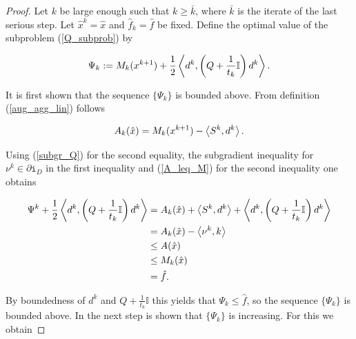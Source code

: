 \begin{proof}
	Let \(k\) be large enough such that \(k \geq \bar{k}\), where \(\bar{k}\) is the iterate of the last serious step. Let \(\hat{x}^k = \hat{x}\) and \(\hat{f}_k=\hat{f}\) be fixed.
	Define the optimal value of the subproblem (\ref{Q_subprob}) by 
	
	\begin{equation}
		\Psi_k := M_k(x^{k+1})+\frac{1}{2}\left\langle d^k,\left(Q+\frac{1}{t_k}\mathbb{I}\right)d^k\right\rangle.
		\label{Psi}
	\end{equation}
	
	It is first shown that the sequence \(\{\Psi_k\}\) is bounded above.
	From definition (\ref{aug_agg_lin}) follows

	
	\begin{equation*}
		A_k(\hat{x}) = M_k(x^{k+1})-\left\langle S^k,d^k \right\rangle.
	\end{equation*}
	
Using (\ref{subgr_Q}) for the second equality, the subgradient inequality for \(\nu^k \in \partial \mathtt{i}_{D}\) in the first inequality and (\ref{A_leq_M}) for the second inequality  one obtains
	
	\begin{align*}
		\Psi^k+\frac{1}{2}\left\langle d^{k},\left(Q+\frac{1}{t_k}\mathbb{I}\right)d^k\right\rangle &= A_k(\hat{x})+\left\langle S^k,d^k\right\rangle + \left\langle d^{k},\left(Q+\frac{1}{t_k}\mathbb{I}\right)d^k\right\rangle \\
		&= A_k(\hat{x})-\left\langle \nu^k,k \right\rangle \\
		&\leq A(\hat{x}) \\
		&\leq M_k(\hat{x}) \\
		& = \hat{f}.
	\end{align*}
	
By boundedness of \(d^k\) and \(Q+\frac{1}{t_k}\mathbb{I}\) this yields that \(\Psi_k \leq \hat{f}\), so the sequence \(\{\Psi_k\}\) is bounded above.
	In the next step is shown that \(\{\Psi_k\}\) is increasing. For this we obtain
	

\end{proof}
